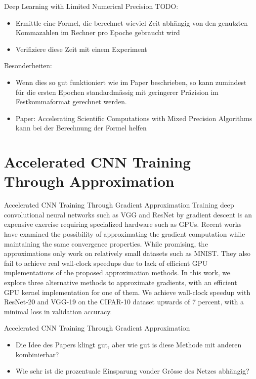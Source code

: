 \documentclass[10pt]{beamer}
\begin{document}
\begin{frame}{Deep Learning with Limited Numerical Precision}
 TODO:
 \begin{itemize}
  \item Ermittle eine Formel, die berechnet wieviel Zeit abhängig von den genutzten Kommazahlen im Rechner pro Epoche gebraucht wird
  \item Verifiziere diese Zeit mit einem Experiment
 \end{itemize}
 Besonderheiten:
 \begin{itemize}
  \item Wenn dies so gut funktioniert wie im Paper beschrieben, so kann zumindest für die ersten Epochen standardmässig mit geringerer Präzision im Festkommaformat gerechnet werden.
  \item Paper: Accelerating Scientific Computations with Mixed
Precision Algorithms kann bei der Berechnung der Formel helfen
 \end{itemize}

\end{frame}

\section{Accelerated CNN Training Through Approximation}

\begin{frame}{Accelerated CNN Training Through Gradient Approximation}
 Training deep convolutional neural networks such as VGG and ResNet by gradient descent is an expensive exercise requiring specialized hardware such as GPUs. Recent works have examined the possibility of approximating the gradient computation while maintaining the same convergence properties. While promising, the approximations only work on relatively small datasets such as MNIST. They also fail to achieve real wall-clock speedups due to lack of efficient GPU implementations of the proposed approximation methods. In this work, we explore three alternative methods to approximate gradients, with an efficient GPU kernel implementation for one of them. We achieve wall-clock speedup with ResNet-20 and VGG-19 on the CIFAR-10 dataset upwards of 7 percent, with a minimal loss in validation accuracy.
\end{frame}

\begin{frame}{Accelerated CNN Training Through Gradient Approximation}
\begin{itemize}
 \item Die Idee des Papers klingt gut, aber wie gut is diese Methode mit anderen kombinierbar?
 \item Wie sehr ist die prozentuale Einsparung vonder Grösse des Netzes abhängig?
\end{itemize}
 
\end{frame}
\end{document}
